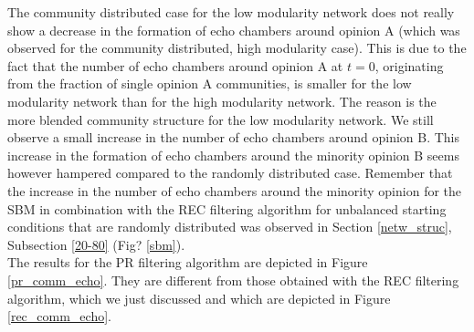 \documentclass[11 pt , letterpaper , twoside , openright]{book}
\begin{document}
\newline
The community distributed case for the low modularity network does not really show a decrease in the formation of echo chambers around opinion A (which was observed for the community distributed, high modularity case). This is due to the fact that the number of echo chambers around opinion A at $t=0$, originating from the fraction of single opinion A communities, is smaller for the low modularity network than for the high modularity network. The reason is the more blended community structure for the low modularity network. We still observe a small increase in the number of echo chambers around opinion B. This increase in the formation of echo chambers around the minority opinion B seems however hampered compared to the randomly distributed case. Remember that the increase in the number of echo chambers around the minority opinion for the SBM in combination with the REC filtering algorithm for unbalanced starting conditions that are randomly distributed was observed in Section \ref{netw_struc}, Subsection \ref{20-80} (Fig? \ref{sbm}). \\
\newline    %
The results for the PR filtering algorithm are depicted in Figure \ref{pr_comm_echo}. They are different from those obtained with the REC filtering algorithm, which we just discussed and which are depicted in Figure \ref{rec_comm_echo}.\\
\newline
\end{document}
